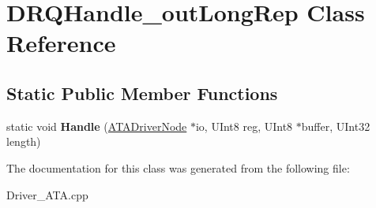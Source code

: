 \hypertarget{class_d_r_q_handle__out_long_rep}{}\section{D\+R\+Q\+Handle\+\_\+out\+Long\+Rep Class Reference}
\label{class_d_r_q_handle__out_long_rep}
\subsection*{Static Public Member Functions}
\begin{DoxyCompactItemize}
\item 
\mbox{\label{class_d_r_q_handle__out_long_rep_acdc740d764873c7d6fc79bec1e76bf7f}} 
static void {\bfseries Handle} (\hyperlink{class_a_t_a_driver_node}{A\+T\+A\+Driver\+Node} $\ast$io, U\+Int8 reg, U\+Int8 $\ast$buffer, U\+Int32 length)
\end{DoxyCompactItemize}


The documentation for this class was generated from the following file\+:\begin{DoxyCompactItemize}
\item 
Driver\+\_\+\+A\+T\+A.\+cpp\end{DoxyCompactItemize}
